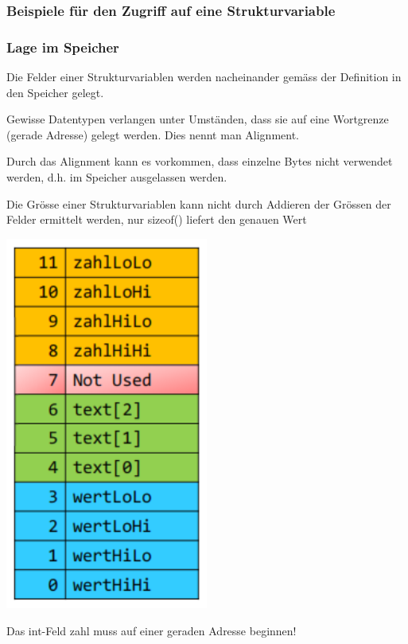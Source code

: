 		\subsubsection{Beispiele für den Zugriff auf eine Strukturvariable}
			\vspace*{-0.2cm}
			
			\vspace*{0.3cm}
		\begin{minipage}[c]{8 cm}
			\subsubsection{Lage im Speicher}
				\begin{compactitem}
					\item Die Felder einer Strukturvariablen werden nacheinander gemäss der Definition in den Speicher gelegt.
					\item Gewisse Datentypen verlangen unter Umständen, dass sie auf eine Wortgrenze (gerade Adresse) gelegt werden. Dies nennt man Alignment.
					\item Durch das Alignment kann es vorkommen, dass einzelne Bytes nicht verwendet werden, d.h. im Speicher ausgelassen werden.
					\item Die Grösse einer Strukturvariablen kann nicht durch Addieren der Grössen der Felder ermittelt werden, nur sizeof() liefert den genauen Wert
				\end{compactitem}
		\end{minipage}
		\hspace*{2cm}
		\begin{minipage}[c]{7 cm}
			\includegraphics[width=0.5\textwidth]{pics/alignment.png}
		\end{minipage}
		\hspace*{-3cm}	
		\begin{minipage}[c]{3 cm}
			
			\vspace*{0.5cm}
			Das int-Feld zahl muss auf einer geraden Adresse beginnen!
		\end{minipage}
